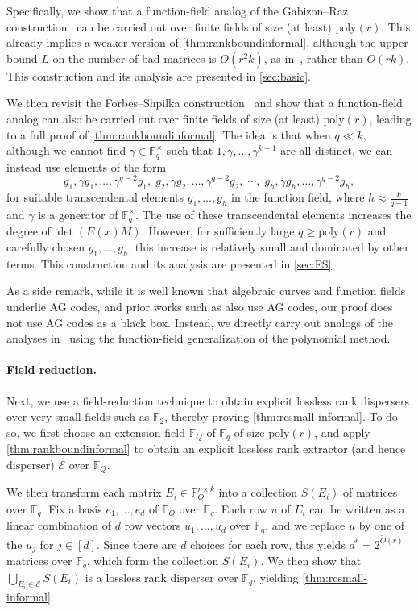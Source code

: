 \documentclass[11pt]{article}
\newcommand{\F}{\mathbb{F}}
\newcommand{\poly}{\mathrm{poly}}
\begin{document}
Specifically, we show that a function-field analog of the Gabizon--Raz construction~\cite{GR08} can be carried out over finite fields of size (at least) $\poly(r)$. This already implies a weaker version of \cref{thm:rankboundinformal}, although the upper bound $L$ on the number of bad matrices is $O(r^2 k)$, as in~\cite{GR08}, rather than $O(rk)$. This construction and its analysis are presented in \cref{sec:basic}. 

We then revisit the Forbes--Shpilka construction~\cite{FS12} and show that a function-field analog can also be carried out over finite fields of size (at least) $\poly(r)$, leading to a full proof of \cref{thm:rankboundinformal}. The idea is that when $q\ll k$, although we cannot find $\gamma\in\F_q^\times$ such that $1,\gamma,\dots,\gamma^{k-1}$ are all distinct, we can instead use elements of the form
\[
g_1,\gamma g_1,\dots,\gamma^{q-2} g_1,\;
g_2,\gamma g_2,\dots,\gamma^{q-2} g_2,\;
\cdots,\;
g_h,\gamma g_h,\dots,\gamma^{q-2} g_h,
\]
for suitable transcendental elements $g_1,\dots,g_h$ in the function field, where $h\approx \frac{k}{q-1}$ and $\gamma$ is a generator of $\F_q^\times$. The use of these transcendental elements increases the degree of $\det(E(x)M)$. However, for sufficiently large $q\ge \poly(r)$ and carefully chosen $g_1,\dots,g_h$, this increase is relatively small and dominated by other terms. This construction and its analysis are presented in \cref{sec:FS}.

As a side remark, while it is well known that algebraic curves and function fields underlie AG codes, and prior works such as \cite{ABDN24,BT24} also use AG codes, our proof does not use AG codes as a black box. Instead, we directly carry out analogs of the analyses in~\cite{GR08,FS12} using the function-field generalization of the polynomial method.

\paragraph{Field reduction.}

Next, we use a field-reduction technique to obtain explicit lossless rank dispersers over very small fields such as $\F_2$, thereby proving \cref{thm:rcsmall-informal}. To do so, we first choose an extension field $\F_Q$ of $\F_q$ of size $\poly(r)$, and apply \cref{thm:rankboundinformal} to obtain an explicit lossless rank extractor (and hence disperser) $\mathcal{E}$ over $\F_Q$. 

We then transform each matrix $E_i\in\F_Q^{r\times k}$ into a collection $S(E_i)$ of matrices over $\F_q$. Fix a basis $e_1,\dots,e_d$ of $\F_Q$ over $\F_q$. Each row $u$ of $E_i$ can be written as a linear combination of $d$ row vectors $u_1,\dots,u_d$ over $\F_q$, and we replace $u$ by one of the $u_j$ for $j\in[d]$. Since there are $d$ choices for each row, this yields $d^r=2^{\widetilde{O}(r)}$ matrices over $\F_q$, which form the collection $S(E_i)$. We then show that $\bigcup_{E_i\in\mathcal{E}} S(E_i)$ is a lossless rank disperser over $\F_q$, yielding \cref{thm:rcsmall-informal}.
\end{document}
